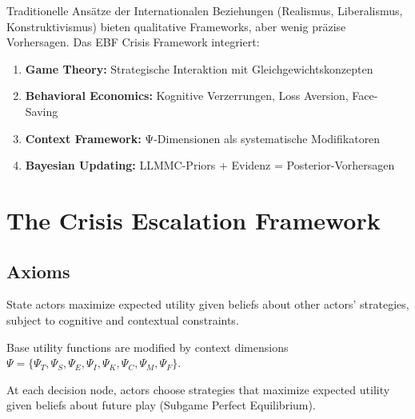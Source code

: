 Traditionelle Ansätze der Internationalen Beziehungen (Realismus, Liberalismus, Konstruktivismus) bieten qualitative Frameworks, aber wenig präzise Vorhersagen. Das EBF Crisis Framework integriert:

\begin{enumerate}
\item \textbf{Game Theory:} Strategische Interaktion mit Gleichgewichtskonzepten
\item \textbf{Behavioral Economics:} Kognitive Verzerrungen, Loss Aversion, Face-Saving
\item \textbf{Context Framework:} Ψ-Dimensionen als systematische Modifikatoren
\item \textbf{Bayesian Updating:} LLMMC-Priors + Evidenz = Posterior-Vorhersagen
\end{enumerate}



\section{The Crisis Escalation Framework}
\label{sec:crisis-framework}

\subsection{Axioms}

\begin{axiom}
\label{ax:rational}
State actors maximize expected utility given beliefs about other actors' strategies, subject to cognitive and contextual constraints.
\end{axiom}

\begin{axiom}
\label{ax:context}
Base utility functions are modified by context dimensions $\Psi = \{\Psi_T, \Psi_S, \Psi_E, \Psi_I, \Psi_K, \Psi_C, \Psi_M, \Psi_F\}$.
\end{axiom}

\begin{axiom}
\label{ax:sequential}
At each decision node, actors choose strategies that maximize expected utility given beliefs about future play (Subgame Perfect Equilibrium).
\end{axiom}

